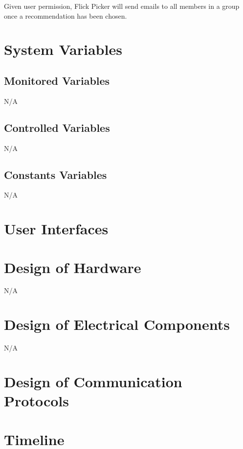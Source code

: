 \documentclass[12pt, titlepage]{article}
\begin{document}
Given user permission, Flick Picker will send emails to all members in a group once a recommendation has been chosen. 

\section{System Variables}

\subsection{Monitored Variables}
N/A

\subsection{Controlled Variables}
N/A

\subsection{Constants Variables}
N/A

\section{User Interfaces}


\section{Design of Hardware}
N/A

\section{Design of Electrical Components}
N/A

\section{Design of Communication Protocols}


\section{Timeline}


% 
\end{document}
